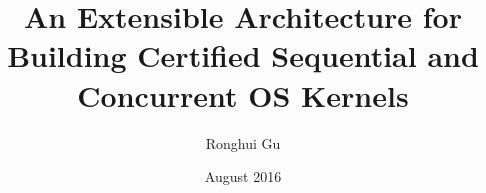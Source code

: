 \documentclass[12pt]{yalephd}
\author{Ronghui Gu}
\title{An Extensible Architecture for Building
Certified Sequential and Concurrent OS Kernels}
\date{August 2016}
\theoremstyle{newstyle}
\begin{document}

\maketitle
\makecopyright



\tableofcontents
\listoffigures
\listoftables
\mainmatter

%









\end{document}
